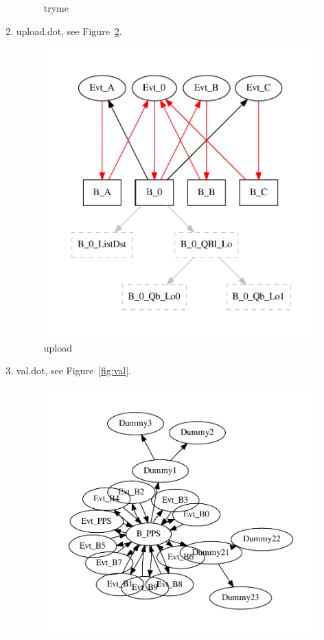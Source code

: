 \documentclass[12pt,a4paper]{report}
\begin{document}
\begin{enumerate}
\begin{figure}
        \caption{tryme}
        \label{fig:tryme}
    \end{figure}
\item upload.dot, see Figure~\ref{fig:upload}.
    \begin{figure}
        \centering
        \includegraphics*[width=1.0\textwidth,keepaspectratio]{TestPattern/upload.pdf}
        \caption{upload}
        \label{fig:upload}
    \end{figure}
\item val.dot, see Figure~\ref{fig:val}.
    \begin{figure}
        \centering
        \includegraphics*[width=1.0\textwidth,keepaspectratio]{TestPattern/val.pdf}

\end{figure}
\end{enumerate}
\end{document}
